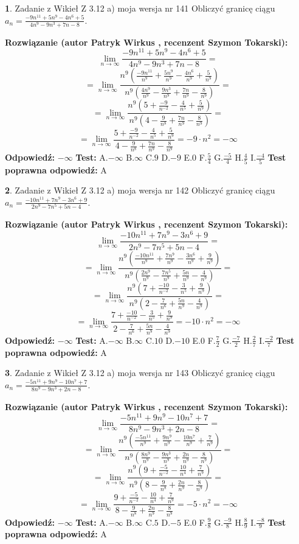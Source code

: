 \documentclass[12pt, a4paper]{article}
\theoremstyle{definition} %
\newtheorem{zad}{}
\newcommand{\zadStart}[1]{\begin{zad}#1\newline}
\newcommand{\zadStop}{\end{zad}}
\newcommand{\rozwStart}[2]{\noindent \textbf{Rozwiązanie (autor #1 , recenzent #2): }\newline}
\newcommand{\rozwStop}{\newline}
\newcommand{\odpStart}{\noindent \textbf{Odpowiedź:}\newline}
\newcommand{\odpStop}{\newline}
\newcommand{\testStart}{\noindent \textbf{Test:}\newline}
\newcommand{\testStop}{\newline}
\newcommand{\kluczStart}{\noindent \textbf{Test poprawna odpowiedź:}\newline}
\newcommand{\kluczStop}{\newline}
\begin{document}
\zadStart{Zadanie z Wikieł Z 3.12 a) moja wersja nr 141}
Obliczyć granicę ciągu $a_{n}=\frac{-9n^{11}+5n^{9}-4n^{6}+5}{4n^{9}-9n^{3}+7n-8}$.
\zadStop
\rozwStart{Patryk Wirkus}{Szymon Tokarski}
$$\lim\limits_{n\to\infty}\frac{-9n^{11}+5n^{9}-4n^{6}+5}{4n^{9}-9n^{3}+7n-8}=$$
$$=\lim\limits_{n\to\infty}\frac{n^{9}\left(\frac{-9n^{11}}{n^{9}}+\frac{5n^{9}}{n^{9}}-\frac{4n^{6}}{n^{9}}+\frac{5}{n^{9}}\right)}{n^{9}\left(\frac{4n^{9}}{n^{9}}-\frac{9n^{3}}{n^{9}}+\frac{7n}{n^{9}}-\frac{8}{n^{9}}\right)}=$$
$$=\lim\limits_{n\to\infty}\frac{n^{9}\left(5+\frac{-9}{n^{-2}}-\frac{4}{n^{5}}+\frac{5}{n^{9}}\right)}
{n^{9}\left(4-\frac{9}{n^{8}}+\frac{7n}{n^{9}}-\frac{8}{n^{9}}\right)}=$$
$$=\lim\limits_{n\to\infty}\frac{5+\frac{-9}{n^{-2}}-\frac{4}{n^{5}}+\frac{5}{n^{9}}}{4-\frac{9}{n^{8}}+\frac{7n}{n^{9}}-\frac{8}{n^{9}}}=-9\cdot n^{2} = -\infty$$
\rozwStop
\odpStart
$-\infty$
\odpStop
\testStart
A.$-\infty$
B.$\infty$
C.$9$
D.$-9$
E.$0$
F.$\frac{5}{4}$
G.$\frac{-5}{4}$
H.$\frac{4}{5}$
I.$\frac{-4}{5}$
\testStop
\kluczStart
A
\kluczStop



\zadStart{Zadanie z Wikieł Z 3.12 a) moja wersja nr 142}
Obliczyć granicę ciągu $a_{n}=\frac{-10n^{11}+7n^{9}-3n^{6}+9}{2n^{9}-7n^{5}+5n-4}$.
\zadStop
\rozwStart{Patryk Wirkus}{Szymon Tokarski}
$$\lim\limits_{n\to\infty}\frac{-10n^{11}+7n^{9}-3n^{6}+9}{2n^{9}-7n^{5}+5n-4}=$$
$$=\lim\limits_{n\to\infty}\frac{n^{9}\left(\frac{-10n^{11}}{n^{9}}+\frac{7n^{9}}{n^{9}}-\frac{3n^{6}}{n^{9}}+\frac{9}{n^{9}}\right)}{n^{9}\left(\frac{2n^{9}}{n^{9}}-\frac{7n^{5}}{n^{9}}+\frac{5n}{n^{9}}-\frac{4}{n^{9}}\right)}=$$
$$=\lim\limits_{n\to\infty}\frac{n^{9}\left(7+\frac{-10}{n^{-2}}-\frac{3}{n^{5}}+\frac{9}{n^{9}}\right)}
{n^{9}\left(2-\frac{7}{n^{6}}+\frac{5n}{n^{9}}-\frac{4}{n^{9}}\right)}=$$
$$=\lim\limits_{n\to\infty}\frac{7+\frac{-10}{n^{-2}}-\frac{3}{n^{5}}+\frac{9}{n^{9}}}{2-\frac{7}{n^{6}}+\frac{5n}{n^{9}}-\frac{4}{n^{9}}}=-10\cdot n^{2} = -\infty$$
\rozwStop
\odpStart
$-\infty$
\odpStop
\testStart
A.$-\infty$
B.$\infty$
C.$10$
D.$-10$
E.$0$
F.$\frac{7}{2}$
G.$\frac{-7}{2}$
H.$\frac{2}{7}$
I.$\frac{-2}{7}$
\testStop
\kluczStart
A
\kluczStop



\zadStart{Zadanie z Wikieł Z 3.12 a) moja wersja nr 143}
Obliczyć granicę ciągu $a_{n}=\frac{-5n^{11}+9n^{9}-10n^{7}+7}{8n^{9}-9n^{3}+2n-8}$.
\zadStop
\rozwStart{Patryk Wirkus}{Szymon Tokarski}
$$\lim\limits_{n\to\infty}\frac{-5n^{11}+9n^{9}-10n^{7}+7}{8n^{9}-9n^{3}+2n-8}=$$
$$=\lim\limits_{n\to\infty}\frac{n^{9}\left(\frac{-5n^{11}}{n^{9}}+\frac{9n^{9}}{n^{9}}-\frac{10n^{7}}{n^{9}}+\frac{7}{n^{9}}\right)}{n^{9}\left(\frac{8n^{9}}{n^{9}}-\frac{9n^{3}}{n^{9}}+\frac{2n}{n^{9}}-\frac{8}{n^{9}}\right)}=$$
$$=\lim\limits_{n\to\infty}\frac{n^{9}\left(9+\frac{-5}{n^{-2}}-\frac{10}{n^{4}}+\frac{7}{n^{9}}\right)}
{n^{9}\left(8-\frac{9}{n^{8}}+\frac{2n}{n^{9}}-\frac{8}{n^{9}}\right)}=$$
$$=\lim\limits_{n\to\infty}\frac{9+\frac{-5}{n^{-2}}-\frac{10}{n^{4}}+\frac{7}{n^{9}}}{8-\frac{9}{n^{8}}+\frac{2n}{n^{9}}-\frac{8}{n^{9}}}=-5\cdot n^{2} = -\infty$$
\rozwStop
\odpStart
$-\infty$
\odpStop
\testStart
A.$-\infty$
B.$\infty$
C.$5$
D.$-5$
E.$0$
F.$\frac{9}{8}$
G.$\frac{-9}{8}$
H.$\frac{8}{9}$
I.$\frac{-8}{9}$
\testStop
\kluczStart
A
\kluczStop
\end{document}
